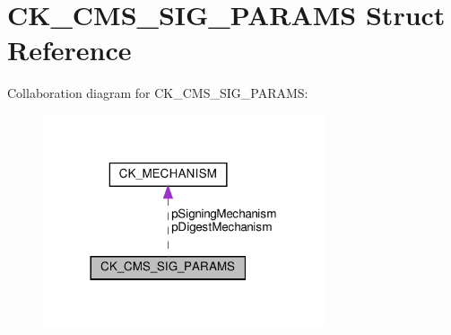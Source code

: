 \hypertarget{struct_c_k___c_m_s___s_i_g___p_a_r_a_m_s}{}\section{C\+K\+\_\+\+C\+M\+S\+\_\+\+S\+I\+G\+\_\+\+P\+A\+R\+A\+MS Struct Reference}
\label{struct_c_k___c_m_s___s_i_g___p_a_r_a_m_s}


Collaboration diagram for C\+K\+\_\+\+C\+M\+S\+\_\+\+S\+I\+G\+\_\+\+P\+A\+R\+A\+MS\+:
\nopagebreak
\begin{figure}[H]
\begin{center}
\leavevmode
\includegraphics[width=236pt]{struct_c_k___c_m_s___s_i_g___p_a_r_a_m_s__coll__graph}
\end{center}
\end{figure}
